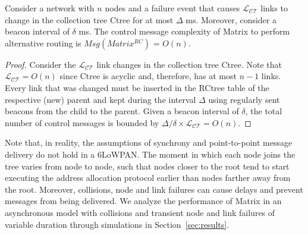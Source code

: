 \begin{theorem} Consider a network with $n$ nodes and a failure event that
causes $\mathcal{L_{CT}}$ links to change in the collection tree Ctree for at
most $\Delta$ ms.
Moreover, consider a beacon interval of $\delta$ ms.
The control message complexity of Matrix to perform
alternative routing is $Msg(Matrix^{RC})$ = $O(n)$.
\end{theorem}
\begin{proof}
Consider the $\mathcal{L_{CT}}$ link changes in the collection tree
Ctree. Note that $\mathcal{L_{CT}} = O(n)$ since Ctree is acyclic
and, therefore, has at most $n-1$ links. Every link that was changed
must be inserted in the RCtree table of the respective (new) parent
and kept during the interval $\Delta$ using regularly sent beacons
from the child to the parent. Given a beacon interval of $\delta$,
the total number of control messages is bounded by
${\Delta}/{\delta} \times \mathcal{L_{CT}} = O(n)$.\end{proof}

Note that, in reality, the assumptions of synchrony and
point-to-point message delivery do not hold in a 6LoWPAN. The moment
in which each node joins the tree varies from node to node, such
that nodes closer to the root tend to start executing the address
allocation protocol earlier than nodes farther away from the root.
Moreover, collisions, node and link failures can cause delays and
prevent messages from being delivered. We analyze the performance of
Matrix in an asynchronous model with collisions and transient node
and link failures of variable duration through simulations in
Section~\ref{sec:results}.
